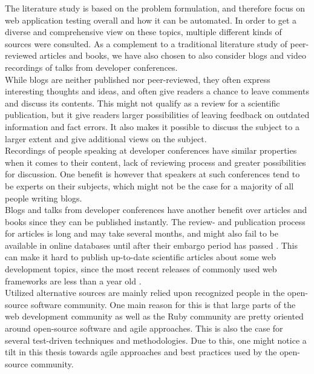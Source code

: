 
The literature study is based on the problem formulation, and therefore
focus on web application testing overall and how it can be automated. In
order to get a diverse and comprehensive view on these topics, multiple
different kinds of sources were consulted. As a complement to a
traditional literature study of peer-reviewed articles and books, we
have also chosen to also consider blogs and video recordings of talks
from developer conferences.\\

While blogs are neither published nor peer-reviewed, they often express
interesting thoughts and ideas, and often give readers a chance to leave
comments and discuss its contents. This might not qualify as a review
for a scientific publication, but it give readers larger possibilities
of leaving feedback on outdated information and fact errors. It also
makes it possible to discuss the subject to a larger extent and give
additional views on the subject.\\

Recordings of people speaking at developer conferences have similar
properties when it comes to their content, lack of reviewing process and
greater possibilities for discussion. One benefit is however that speakers
at such conferences tend to be experts on their subjects, which might
not be the case for a majority of all people writing blogs.\\

Blogs and talks from developer conferences have another benefit
over articles and books since they can be published instantly. The
review- and publication process for articles is long and may take
several months, and might also fail to be available in online databases
until after their embargo period has passed \cite{wiki:embargo,
pdf:publishing}. This can make it hard to publish up-to-date scientific
articles about some web development topics, since the most recent
releases of commonly used web frameworks are less than a year old
\cite{wiki:rails_versions, wiki:django_versions,
web:knockout_versions}.\\

Utilized alternative sources are mainly relied upon recognized people in
the open-source software community. One main reason for this is that
large parts of the web development community as well as the Ruby
community are pretty oriented around open-source software and agile
approaches. This is also the case for several test-driven techniques and
methodologies. Due to this, one might notice a tilt in this thesis
towards agile approaches and best practices used by the open-source
community.\\
